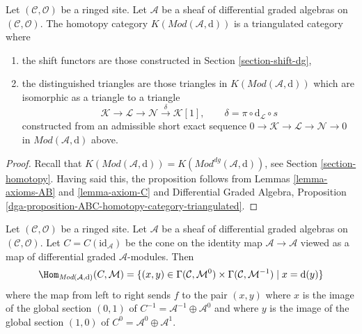 \begin{proposition}
\label{proposition-homotopy-category-triangulated}
Let $(\mathcal{C}, \mathcal{O})$ be a ringed site.
Let $\mathcal{A}$ be a sheaf of differential graded algebras
on $(\mathcal{C}, \mathcal{O})$.
The homotopy category $K(\textit{Mod}(\mathcal{A}, \text{d}))$
is a triangulated category where
\begin{enumerate}
\item the shift functors are those constructed in
Section \ref{section-shift-dg},
\item the distinguished triangles are those triangles
in $K(\textit{Mod}(\mathcal{A}, \text{d}))$ which are
isomorphic as a triangle to a triangle
$$
\mathcal{K} \to \mathcal{L} \to \mathcal{N}
\xrightarrow{\delta} \mathcal{K}[1],\quad\quad
\delta = \pi \circ \text{d}_\mathcal{L} \circ s
$$
constructed from an admissible short exact sequence
$0 \to \mathcal{K} \to \mathcal{L} \to \mathcal{N} \to 0$
in $\textit{Mod}(\mathcal{A}, \text{d})$ above.
\end{enumerate}
\end{proposition}

\begin{proof}
Recall that $K(\textit{Mod}(\mathcal{A}, \text{d})) =
K(\textit{Mod}^{dg}(\mathcal{A}, \text{d}))$, see
Section \ref{section-homotopy}.
Having said this, the proposition
follows from Lemmas \ref{lemma-axioms-AB} and \ref{lemma-axiom-C}
and
Differential Graded Algebra, Proposition
\ref{dga-proposition-ABC-homotopy-category-triangulated}.
\end{proof}

\begin{remark}
\label{remark-cone-identity}
Let $(\mathcal{C}, \mathcal{O})$ be a ringed site.
Let $\mathcal{A}$ be a sheaf of differential graded algebras
on $(\mathcal{C}, \mathcal{O})$. Let $C = C(\text{id}_\mathcal{A})$
be the cone on the identity map $\mathcal{A} \to \mathcal{A}$ viewed
as a map of differential graded $\mathcal{A}$-modules.
Then
$$
\Hom_{\textit{Mod}(\mathcal{A}, \text{d})}(C, \mathcal{M}) =
\{(x, y) \in
\Gamma(\mathcal{C}, \mathcal{M}^0) \times
\Gamma(\mathcal{C}, \mathcal{M}^{-1}) \mid
x = \text{d}(y)\}
$$
where the map from left to right sends $f$ to the pair $(x, y)$
where $x$ is the image of the global section $(0, 1)$ of
$C^{-1} = \mathcal{A}^{-1} \oplus \mathcal{A}^0$ and where
$y$ is the image of the global section $(1, 0)$ of
$C^0 = \mathcal{A}^0 \oplus \mathcal{A}^1$.
\end{remark}

